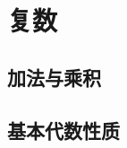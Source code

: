 \documentclass[a4paper, 11pt]{ctexbook}
\begin{document}
    \tableofcontents
    \chapter{复数}
        \section{加法与乘积}
        \section{基本代数性质}
            
\end{document}
